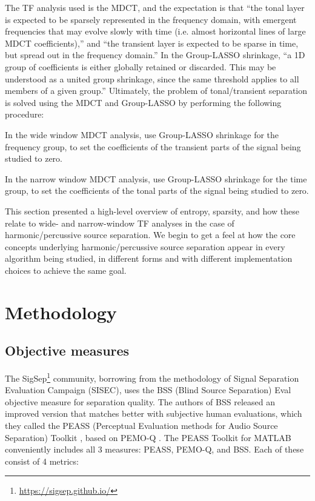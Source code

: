 \documentclass[letter,12pt]{article}
\newenvironment{tight_itemize}{
\begin{itemize}
  \setlength{\itemsep}{0pt}
  \setlength{\parskip}{0pt}
}{\end{itemize}}
\begin{document}
The TF analysis used is the MDCT, and the expectation is that ``the  tonal  layer  is  expected  to  be  sparsely  represented in the frequency domain, with emergent frequencies that may evolve slowly with time (i.e. almost horizontal lines of large MDCT coefficients),'' and ``the transient layer is expected to be sparse in time, but spread out in the frequency domain.'' In the Group-LASSO shrinkage, ``a 1D group of coefficients is either globally retained or discarded. This may be understood as a united group shrinkage, since the same threshold applies to all members of a given group.'' Ultimately, the problem of tonal/transient separation is solved using the MDCT and Group-LASSO by performing the following procedure:

\begin{tight_itemize}
	\item
		In the wide window MDCT analysis, use Group-LASSO shrinkage for the frequency group, to set the coefficients of the transient parts of the signal being studied to zero.
	\item
		In the narrow window MDCT analysis, use Group-LASSO shrinkage for the time group, to set the coefficients of the tonal parts of the signal being studied to zero.
\end{tight_itemize}

This section presented a high-level overview of entropy, sparsity, and how these relate to wide- and narrow-window TF analyses in the case of harmonic/percussive source separation. We begin to get a feel at how the core concepts underlying harmonic/percussive source separation appear in every algorithm being studied, in different forms and with different implementation choices to achieve the same goal.

\vfill
\clearpage

\section{Methodology}
\label{sec:methodology}

\subsection{Objective measures}

The SigSep\footnote{\url{https://sigsep.github.io/}} community, borrowing from the methodology of Signal Separation Evaluation Campaign (SISEC), uses the BSS (Blind Source Separation) Eval \cite{bss} objective measure for separation quality. The authors of BSS released an improved version that matches better with subjective human evaluations, which they called the PEASS (Perceptual Evaluation methods for Audio Source Separation) Toolkit \cite{peass}, based on PEMO-Q \cite{pemoq}. The PEASS Toolkit for MATLAB \cite{peassmatlab} conveniently includes all 3 measures: PEASS, PEMO-Q, and BSS. Each of these consist of 4 metrics:
\end{document}
